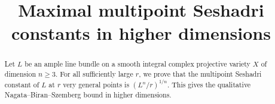\documentclass[11pt,a4paper]{amsart}
\title{Maximal multipoint Seshadri constants in higher dimensions}
\author{}
\date{}
\begin{document}
\begin{abstract}
Let $L$ be an ample line bundle on a smooth integral complex projective variety $X$ of dimension $n\geq3$. For all sufficiently large $r$, we prove that the multipoint Seshadri constant of $L$ at $r$ very general points is $(L^n/r)^{1/n}$. This gives the qualitative Nagata--Biran--Szemberg bound in higher dimensions.
\end{abstract}

\maketitle








\printbibliography
\end{document}
